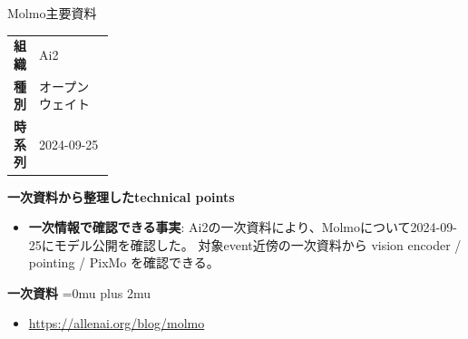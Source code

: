 \begin{technicalnote}{Molmo}{主要資料}
\begingroup
\begin{tabularx}{\linewidth}{@{}>{\bfseries}p{0.22\linewidth}X@{}}
組織 & Ai2 \\
種別 & オープンウェイト \\
時系列 & 2024-09-25 \\
\end{tabularx}
\smallskip
{\bfseries 一次資料から整理したtechnical points}
\begin{itemize}[leftmargin=1.5em,itemsep=0.35em]
\item \textbf{一次情報で確認できる事実}: Ai2の一次資料により、Molmoについて2024-09-25にモデル公開を確認した。 対象event近傍の一次資料から vision encoder / pointing / PixMo を確認できる。
\end{itemize}
\begin{minipage}{\linewidth}
\begin{samepage}
{\bfseries 一次資料}
\begingroup\sloppy
\Urlmuskip=0mu plus 2mu\relax
\begin{itemize}[leftmargin=1.5em,itemsep=0.25em]
\item {\scriptsize\url{https://allenai.org/blog/molmo}}
\end{itemize}
\endgroup
\end{samepage}
\end{minipage}
\endgroup
\end{technicalnote}
\medskip

